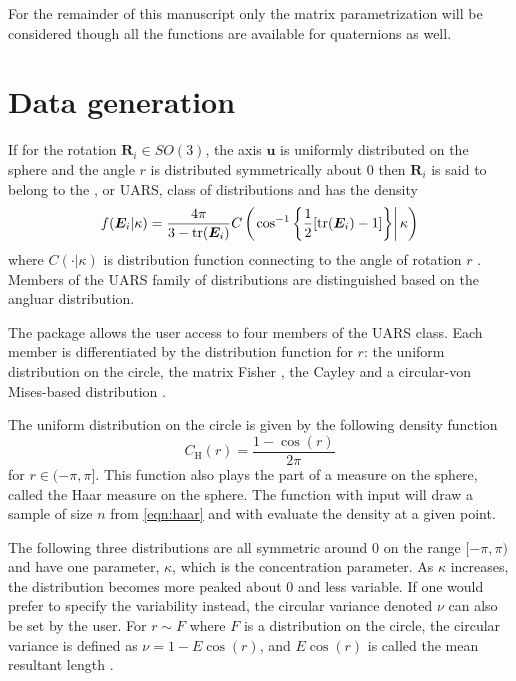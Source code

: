 For the remainder of this manuscript only the matrix parametrization will be considered though all the functions are available for quaternions as well.

\section{Data generation} 

If for the rotation $\bm{R}_i\in SO(3)$, the axis $\bm u$ is uniformly distributed on the sphere and the angle $r$ is distributed symmetrically about $0$ then $\bm R_i$ is said to belong to the , or UARS, class of distributions and has the density
\begin{equation}\label{eq:uarsden}
f(\bm E_i|\kappa)=\frac{4\pi}{3-\text{tr}(\bm E_i)}C\left(\left.\cos^{-1}\left\{\frac{1}{2}[\text{tr}(\bm E_i)-1]\right\}\right|\kappa\right)
\end{equation}
where $C(\cdot|\kappa)$ is distribution function connecting to the angle of rotation $r$ \citep{bingham2009}.  Members of the UARS family of distributions are distinguished based on the angluar distribution.


The  package allows the user access to four members of the UARS class.  Each member is differentiated by the distribution function for $r$: the uniform distribution on the circle, the matrix Fisher \citep{langevin2005, downs1972, khatri1977, jupp1979}, the Cayley  \citep{Schaeben1997, leon2006} and a circular-von Mises-based distribution \citep{bingham2009}. 


The uniform distribution on the circle is given by the following density function
\begin{equation}\label{eqn:haar}
C_\mathrm{{H}}(r)=\frac{1-\cos(r)}{2\pi}
\end{equation}
for $r\in(-\pi,\pi]$.  This function also plays the part of a measure on the sphere, called the Haar measure on the sphere.  The function  with input  will draw a sample of size $n$ from \eqref{eqn:haar} and  with evaluate the density at a given point.

The following three distributions are all symmetric around $0$ on the range $[-\pi,\pi)$ and have one parameter, $\kappa$, which is the concentration parameter.  As $\kappa$ increases, the distribution becomes more peaked about $0$ and less variable.  If one would prefer to specify the variability instead, the circular variance denoted $\nu$ can also be set by the user.  For $r\sim F$ where $F$ is a distribution on the circle, the circular variance is defined as $\nu=1-E\cos(r)$, and $E\cos(r)$ is called the mean resultant length \citep{mardia2000}.

